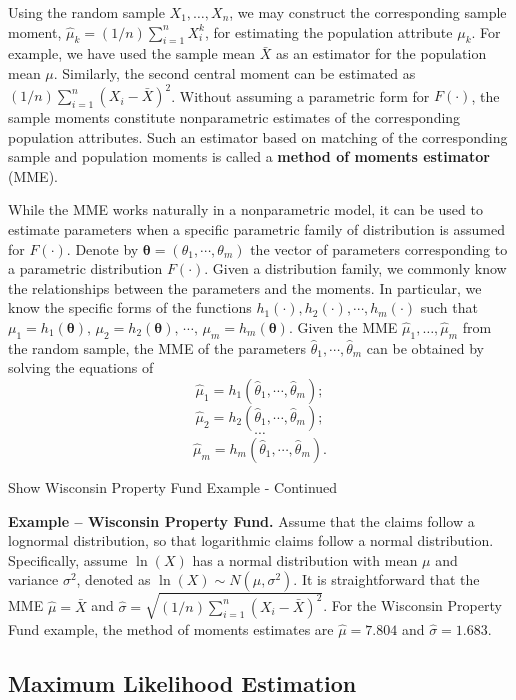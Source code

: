 \documentclass[]{book}
\theoremstyle{definition}
\theoremstyle{definition}
\theoremstyle{definition}
\theoremstyle{remark}
\begin{document}
Using the random sample \(X_1, \ldots, X_n\), we may construct the
corresponding sample moment, \(\hat{\mu}_k=(1/n)\sum_{i=1}^n X_i^k\),
for estimating the population attribute \(\mu_k\). For example, we have
used the sample mean \(\bar{X}\) as an estimator for the population mean
\(\mu\). Similarly, the second central moment can be estimated as
\((1/n)\sum_{i=1}^n(X_i-\bar{X})^2\). Without assuming a parametric form
for \(F(\cdot)\), the sample moments constitute nonparametric estimates
of the corresponding population attributes. Such an estimator based on
matching of the corresponding sample and population moments is called a
\textbf{method of moments estimator} (MME).

While the MME works naturally in a nonparametric model, it can be used
to estimate parameters when a specific parametric family of distribution
is assumed for \(F(\cdot)\). Denote by
\(\boldsymbol{\theta}=(\theta_1,\cdots,\theta_m)\) the vector of
parameters corresponding to a parametric distribution \(F(\cdot)\).
Given a distribution family, we commonly know the relationships between
the parameters and the moments. In particular, we know the specific
forms of the functions \(h_1(\cdot),h_2(\cdot),\cdots,h_m(\cdot)\) such
that
\(\mu_1=h_1(\boldsymbol{\theta}),\,\mu_2=h_2(\boldsymbol{\theta}),\,\cdots,\,\mu_m=h_m(\boldsymbol{\theta})\).
Given the MME \(\hat{\mu}_1, \ldots, \hat{\mu}_m\) from the random
sample, the MME of the parameters
\(\hat{\theta}_1,\cdots,\hat{\theta}_m\) can be obtained by solving the
equations of \[\hat{\mu}_1=h_1(\hat{\theta}_1,\cdots,\hat{\theta}_m);\]
\[\hat{\mu}_2=h_2(\hat{\theta}_1,\cdots,\hat{\theta}_m);\] \[\cdots\]
\[\hat{\mu}_m=h_m(\hat{\theta}_1,\cdots,\hat{\theta}_m).\]

Show Wisconsin Property Fund Example - Continued

\hypertarget{EXM:S1:MME}{}
\textbf{Example -- Wisconsin Property Fund.} Assume that the claims
follow a lognormal distribution, so that logarithmic claims follow a
normal distribution. Specifically, assume \(\ln(X)\) has a normal
distribution with mean \(\mu\) and variance \(\sigma^2\), denoted as
\(\ln(X) \sim N(\mu, \sigma^2)\). It is straightforward that the MME
\(\hat{\mu}=\bar{X}\) and
\(\hat{\sigma}=\sqrt{(1/n)\sum_{i=1}^n(X_i-\bar{X})^2}\). For the
Wisconsin Property Fund example, the method of moments estimates are
\(\hat{\mu} =7.804\) and \(\hat{\sigma} = 1.683\).

\subsection{Maximum Likelihood Estimation}\label{S:AppA:MLE}
\end{document}
